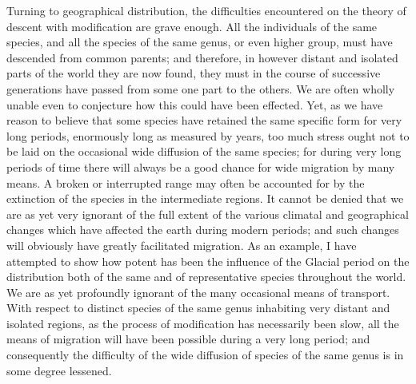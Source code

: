 \indent Turning to geographical distribution, the difficulties encountered on the theory of descent with modification are grave enough. All the individuals of the same species, and all the species of the same genus, or even higher group, must have descended from common parents; and therefore, in however distant and isolated parts of the world they are now found, they must in the course of successive generations have passed from some one part to the others. We are often wholly unable even to conjecture how this could have been effected. Yet, as we have reason to believe that some species have retained the same specific form for very long periods, enormously long as measured by years, too much stress ought not to be laid on the occasional wide diffusion of the same species; for during very long periods of time there will always be a good chance for wide migration by many means. A broken or interrupted range may often be accounted for by the extinction of the species in the intermediate regions. It cannot be denied that we are as yet very ignorant of the full extent of the various climatal and geographical changes which have affected the earth during modern periods; and such changes will obviously have greatly facilitated migration. As an example, I have attempted to show how potent has been the influence of the Glacial period on the distribution both of the same and of representative species throughout the world. We are as yet profoundly ignorant of the many occasional means of transport. With respect to distinct species of the same genus inhabiting very distant and isolated regions, as the process of modification has necessarily been slow, all the means of migration will have been possible during a very long period; and consequently the difficulty of the wide diffusion of species of the same genus is in some degree lessened.~\\
